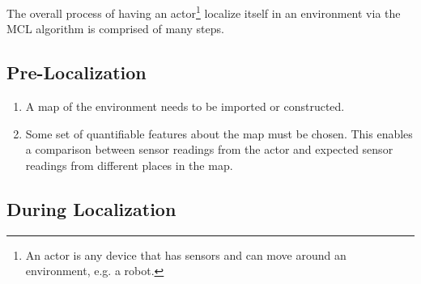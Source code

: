 \documentclass[a4paper,11pt]{article}
\begin{document}
The overall process of having an actor\footnote{An actor is any device that has sensors and can move around an environment, e.g. a robot.} localize itself in an environment via the MCL algorithm is comprised of many steps.
\subsection{Pre-Localization}
  
  \begin{enumerate}
  \item A map of the environment needs to be imported or constructed.
  \item Some set of quantifiable features about the map must be chosen. This enables a comparison between sensor readings from the actor and expected sensor readings from different places in the map.
  \end{enumerate}
\subsection{ During Localization}
  
\end{document}
